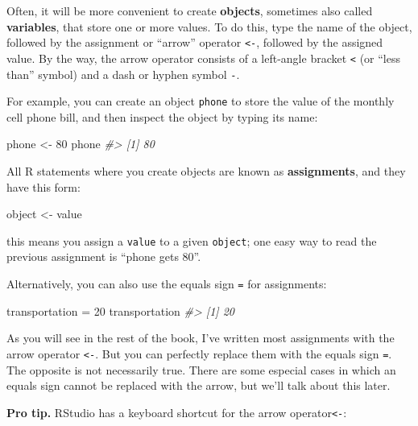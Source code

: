 \documentclass[
]{book}
\newenvironment{Shaded}{\begin{snugshade}}{\end{snugshade}}
\newcommand{\CommentTok}[1]{\textcolor[rgb]{0.56,0.35,0.01}{\textit{#1}}}
\newcommand{\DecValTok}[1]{\textcolor[rgb]{0.00,0.00,0.81}{#1}}
\newcommand{\NormalTok}[1]{#1}
\newcommand{\OtherTok}[1]{\textcolor[rgb]{0.56,0.35,0.01}{#1}}
\begin{document}
Often, it will be more convenient to create \textbf{objects}, sometimes also called
\textbf{variables}, that store one or more values. To do this, type the name of the
object, followed by the assignment or ``arrow'' operator \texttt{\textless{}-}, followed by the
assigned value. By the way, the arrow operator consists of a left-angle bracket
\texttt{\textless{}} (or ``less than'' symbol) and a dash or hyphen symbol \texttt{-}.

For example, you can create an object \texttt{phone} to store the value of the monthly
cell phone bill, and then inspect the object by typing its name:

\begin{Shaded}
\begin{Highlighting}[]
\NormalTok{phone }\OtherTok{\textless{}{-}} \DecValTok{80}
\NormalTok{phone}
\CommentTok{\#\textgreater{} [1] 80}
\end{Highlighting}
\end{Shaded}

All R statements where you create objects are known as \textbf{assignments}, and
they have this form:

\begin{Shaded}
\begin{Highlighting}[]
\NormalTok{object }\OtherTok{\textless{}{-}}\NormalTok{ value}
\end{Highlighting}
\end{Shaded}

this means you assign a \texttt{value} to a given \texttt{object}; one easy way to read the
previous assignment is ``phone gets 80''.

Alternatively, you can also use the equals sign \texttt{=} for assignments:

\begin{Shaded}
\begin{Highlighting}[]
\NormalTok{transportation }\OtherTok{=} \DecValTok{20}
\NormalTok{transportation}
\CommentTok{\#\textgreater{} [1] 20}
\end{Highlighting}
\end{Shaded}

As you will see in the rest of the book, I've written most assignments with the
arrow operator \texttt{\textless{}-}. But you can perfectly replace them with the equals sign
\texttt{=}. The opposite is not necessarily true. There are some especial cases in
which an equals sign cannot be replaced with the arrow, but we'll talk about
this later.

\textbf{Pro tip.} RStudio has a keyboard shortcut for the arrow operator\texttt{\textless{}-}:
\end{document}
